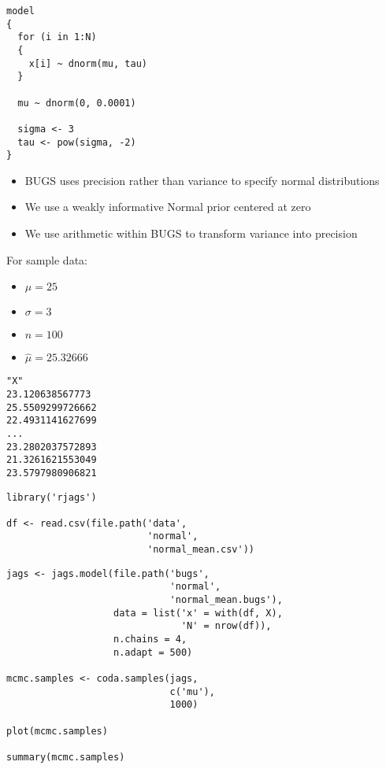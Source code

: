 \documentclass{beamer}
\begin{document}
\begin{frame}[fragile]
  \begin{verbatim}
model
{
  for (i in 1:N)
  {
    x[i] ~ dnorm(mu, tau)
  }
  
  mu ~ dnorm(0, 0.0001)
  
  sigma <- 3
  tau <- pow(sigma, -2)
}
  \end{verbatim}
\end{frame}

\begin{frame}[fragile]
  \begin{itemize}
    \item{BUGS uses precision rather than variance to specify normal distributions}
    \item{We use a weakly informative Normal prior centered at zero}
    \item{We use arithmetic within BUGS to transform variance into precision}
  \end{itemize}
\end{frame}

\begin{frame}[fragile]
  For sample data:
  \begin{itemize}
    \item{$\mu = 25$}
    \item{$\sigma = 3$}
    \item{$n = 100$}
    \item{$\hat{\mu} = 25.32666$}
  \end{itemize}
\end{frame}

\begin{frame}[fragile]
  \begin{verbatim}
"X"
23.120638567773
25.5509299726662
22.4931141627699
...
23.2802037572893
21.3261621553049
23.5797980906821
  \end{verbatim}
\end{frame}


\begin{frame}[fragile]
  \begin{verbatim}
library('rjags')

df <- read.csv(file.path('data',
                         'normal',
                         'normal_mean.csv'))
  \end{verbatim}
\end{frame}

\begin{frame}[fragile]
  \begin{verbatim}
jags <- jags.model(file.path('bugs',
                             'normal',
                             'normal_mean.bugs'),
                   data = list('x' = with(df, X),
                               'N' = nrow(df)),
                   n.chains = 4,
                   n.adapt = 500)
                   
mcmc.samples <- coda.samples(jags,
                             c('mu'),
                             1000)

plot(mcmc.samples)

summary(mcmc.samples)
  \end{verbatim}
\end{frame}
\end{document}
